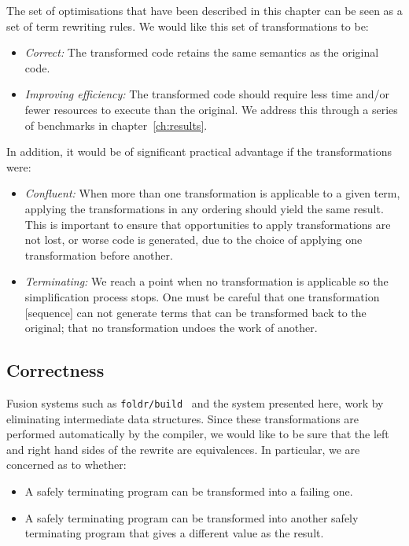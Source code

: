 The set of optimisations that have been described in this chapter can be seen as
a set of term rewriting rules. We would like this set of transformations to be:
%
\begin{itemize}
    \item \emph{Correct:} The transformed code retains the same semantics as the
        original code.

    \item \emph{Improving efficiency:} The transformed code should require less
        time and/or fewer resources to execute than the original. We address
        this through a series of benchmarks in chapter~\ref{ch:results}.
\end{itemize}
%
In addition, it would be of significant practical advantage if the
transformations were:
%
\begin{itemize}
    \item \emph{Confluent:} When more than one transformation is applicable to a
        given term, applying the transformations in any ordering should yield
        the same result. This is important to ensure that opportunities to apply
        transformations are not lost, or worse code is generated, due to the
        choice of applying one transformation before another.

    \item \emph{Terminating:} We reach a point when no transformation is
        applicable so the simplification process stops. One must be careful that
        one transformation [sequence] can not generate terms that can be
        transformed back to the original; that no transformation undoes the work
        of another.
\end{itemize}


\subsection{Correctness}

Fusion systems such as \texttt{foldr/build}~\cite{Gill:1993de} and the system
presented here, work by eliminating intermediate data structures. Since these
transformations are performed automatically by the compiler, we would like to be
sure that the left and right hand sides of the rewrite are equivalences.
In particular, we are concerned as to whether:
%
\begin{itemize}
    \item A safely terminating program can be transformed into a failing one.
    \item A safely terminating program can be transformed into another safely
        terminating program that gives a different value as the result.
\end{itemize}

